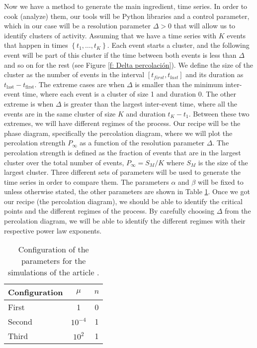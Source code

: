 Now we have a method to generate the main ingredient, time series. In order to cook (analyze) them, our tools will be Python libraries and a control parameter, which in our case will be 
a resolution parameter $\Delta >0$ that will allow us to identify clusters of activity. Assuming that we have a time series with $K$ events that happen in times $\left\{ t_1,\ldots, t_K \right\}$.
Each event starts a cluster, and the following event will be part of this cluster if the time between both events is less than $\Delta$ and so on for the rest 
(see Figure \ref{f: Delta percolación}). We define the size of the cluster 
as the number of events in the interval $[t_{first},t_{last}]$ and its duration as $t_{\mathrm{last}}-t_{\mathrm{first}}$. The extreme cases are when $\Delta$ is smaller than the minimum inter-event time, 
where each event is a cluster of size 1 and duration 0. The other extreme is when $\Delta$ is greater than the largest inter-event time, where all the events are in the same cluster of size $K$
and duration $t_K-t_1$. Between these two extremes, we will have different regimes of the process. Our recipe will be the phase diagram, specifically the percolation diagram, where we will
plot the percolation strength $P_{\infty}$ as a function of the resolution parameter $\Delta$. The percolation strength is defined as the fraction of events that are in the largest cluster over
the total number of events, $P_\infty=S_M/K$ where $S_M$ is the size of the largest cluster. 
Three different sets of parameters will be used to generate the time series in order to compare them. The parameters $\alpha$ and $\beta$ will be fixed to unless 
otherwise stated, the other parameters are shown in Table \ref{tab: parameters}. Once we got our recipe (the percolation diagram), we should be able to identify the critical points and the
different regimes of the process. By carefully choosing  $\Delta$ from the percolation diagram, we will be able to identify the different regimes with their respective power law exponents. 


\begin{table}[H]
    \centering
    \caption{Configuration of the parameters for the simulations of the article \cite{notarmuzi2021percolation}.}
    \label{tab: parameters}
    \begin{tabular}{@{}lcc@{}}
    \toprule
    Configuration & \multicolumn{1}{c}{$\mu$} & \multicolumn{1}{c}{$n$} \\ \midrule
    First & 1 & 0 \\
    Second & $10^{-4}$ & 1 \\
    Third & $10^2$ & 1 \\ \bottomrule
    \end{tabular}
\end{table}

